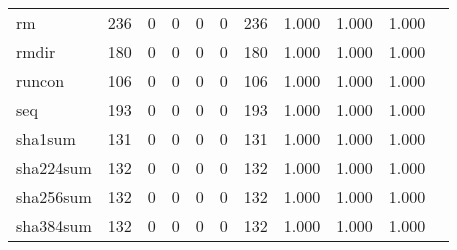 \begin{longtable}{lp{1.10cm}p{1.10cm}p{1.10cm}p{1.10cm}p{1.10cm}p{1.10cm}p{1.10cm}p{1.10cm}p{1.10cm}p{1.10cm}}
rm        &                    236 &                                  0 &                                 0 &                                0 &                                 0 &                             236 &                          1.000 &                                 1.000 &                               1.000 \\
rmdir     &                    180 &                                  0 &                                 0 &                                0 &                                 0 &                             180 &                          1.000 &                                 1.000 &                               1.000 \\
runcon    &                    106 &                                  0 &                                 0 &                                0 &                                 0 &                             106 &                          1.000 &                                 1.000 &                               1.000 \\
seq       &                    193 &                                  0 &                                 0 &                                0 &                                 0 &                             193 &                          1.000 &                                 1.000 &                               1.000 \\
sha1sum   &                    131 &                                  0 &                                 0 &                                0 &                                 0 &                             131 &                          1.000 &                                 1.000 &                               1.000 \\
sha224sum &                    132 &                                  0 &                                 0 &                                0 &                                 0 &                             132 &                          1.000 &                                 1.000 &                               1.000 \\
sha256sum &                    132 &                                  0 &                                 0 &                                0 &                                 0 &                             132 &                          1.000 &                                 1.000 &                               1.000 \\
sha384sum &                    132 &                                  0 &                                 0 &                                0 &                                 0 &                             132 &                          1.000 &                                 1.000 &                               1.000 \\

\end{longtable}

